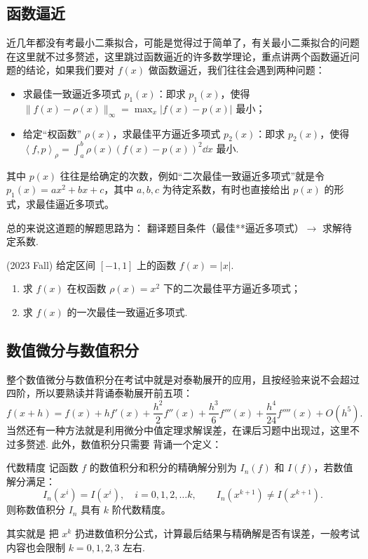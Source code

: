 \subsection*{函数逼近}
近几年都没有考最小二乘拟合，可能是觉得过于简单了，有关最小二乘拟合的问题在这里就不过多赘述，这里跳过函数逼近的许多数学理论，重点讲两个函数逼近问题的结论，如果我们要对 $f(x)$ 做函数逼近，我们往往会遇到两种问题：
\begin{itemize}
    \item 求最佳一致逼近多项式 $p_1(x)$：即求 $p_1(x)$，使得 $\|f(x) - \rho(x)\|_\infty = \max_x|f(x)-p(x)|$ 最小；
    \item 给定“权函数” $\rho(x)$，求最佳平方逼近多项式 $p_2(x)$：即求 $p_2(x)$，使得 $\left<f,p\right>_\rho = \int_a^b \rho(x)(f(x)-p(x))^2\dd x$ 最小.
\end{itemize}
其中 $p(x)$ 往往是给确定的次数，例如“二次最佳一致逼近多项式”就是令 $p_1(x) = ax^2+bx+c$，其中 $a,b,c$ 为待定系数，有时也直接给出 $p(x)$ 的形式，求最佳逼近多项式。

总的来说这道题的解题思路为：{\color{red} 翻译题目条件（最佳**逼近多项式）$\to$ 求解待定系数.}

\begin{problembox}
    \begin{example}
        (2023 Fall) 给定区间 $[-1,1]$ 上的函数 $f(x)= |x|$.
        \begin{enumerate}
            \item 求 $f(x)$ 在权函数 $\rho(x) = x^2$ 下的二次最佳平方逼近多项式；
            \item 求 $f(x)$ 的一次最佳一致逼近多项式.
        \end{enumerate}
    \end{example}
    \begin{solution}
        
    \end{solution}
\end{problembox}

\subsection*{数值微分与数值积分}
整个数值微分与数值积分在考试中就是对泰勒展开的应用，且按经验来说不会超过四阶，所以要熟读并背诵泰勒展开前五项：
\[
    f(x+h) = f(x)+hf'(x)+\dfrac{h^2}{2}f''(x)+\dfrac{h^3}{6}f'''(x)+\dfrac{h^4}{24}f''''(x)+O(h^5).
\]
当然还有一种方法就是利用微分中值定理求解误差，在课后习题中出现过，这里不过多赘述. 此外，数值积分只需要{\color{red} 背诵一个定义}：
\begin{definition}{代数精度}{}
    记函数 $f$ 的数值积分和积分的精确解分别为 $I_n(f)$ 和 $I(f)$，若数值解分满足：
    \[
        I_n(x^i) = I(x^i),\quad i = 0,1,2,\dots k,\qquad I_n(x^{k+1})\neq I(x^{k+1}).
    \]
    则称数值积分 $I_n$ 具有 $k$ 阶代数精度。
\end{definition}
其实就是{\color{red} 把 $x^k$ 扔进数值积分公式，计算最后结果与精确解是否有误差}，一般考试内容也会限制 $k=0,1,2,3$ 左右.

